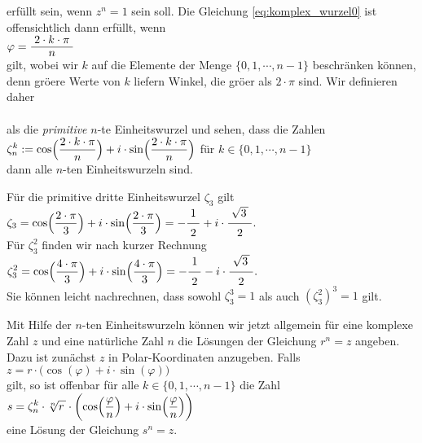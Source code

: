 erf\"{u}llt sein, wenn $z^n = 1$ sein soll.  Die Gleichung \ref{eq:komplex_wurzel0} ist offensichtlich dann
erf\"{u}llt, wenn 
\\[0.2cm]
\hspace*{1.3cm}
$\varphi = \bruch{2 \cdot k \cdot \pi}{n}$
\\[0.2cm]
gilt, wobei wir $k$ auf die Elemente der Menge $\{0,1, \cdots, n-1\}$ beschr\"{a}nken k\"{o}nnen, denn gr\"{o}\3ere
Werte von $k$ liefern Winkel, die gr\"{o}\3er als $2 \cdot \pi$ sind.  Wir definieren daher
\\[0.2cm]
\hspace*{1.3cm}
\colorbox{red}{}
\\[0.2cm]
als die \emph{\color{blue}primitive} $n$-te Einheitswurzel und sehen, dass die Zahlen
\\[0.2cm]
\hspace*{1.3cm}
$\displaystyle\zeta_n^k := \cos\Bigl(\frac{2 \cdot k \cdot \pi}{n}\Bigr) + i \cdot \sin\Bigl(\frac{2 \cdot k \cdot \pi}{n}\Bigr)$
\quad f\"{u}r $k \in \{ 0, 1, \cdots, n-1 \}$
\\[0.2cm]
dann alle $n$-ten Einheitswurzeln sind.

\example
F\"{u}r die primitive dritte Einheitswurzel $\zeta_3$ gilt
\\[0.2cm]
\hspace*{1.3cm}
$\ds\zeta_3 = \cos\Bigl(\frac{2 \cdot \pi}{3}\Bigr) + i \cdot \sin\Bigl(\frac{2 \cdot \pi}{3}\Bigr)
 = - \bruch{1}{2} + i \cdot \bruch{\sqrt{3\,}}{2}. 
$
\\[0.2cm] 
F\"{u}r $\zeta_3^2$ finden wir nach kurzer Rechnung
\\[0.2cm]
\hspace*{1.3cm}
$\ds\zeta_3^2 = \cos\Bigl(\frac{4 \cdot \pi}{3}\Bigr) + i \cdot \sin\Bigl(\frac{4 \cdot \pi}{3}\Bigr)
 = - \bruch{1}{2} - i \cdot \bruch{\sqrt{3\,}}{2}. 
$
\\[0.2cm]
Sie k\"{o}nnen leicht nachrechnen, dass sowohl $\zeta_3^3 = 1$ als auch $(\zeta_3^2)^3 = 1$ gilt.
\vspace*{0.2cm}

Mit Hilfe der $n$-ten Einheitswurzeln k\"{o}nnen wir jetzt allgemein f\"{u}r eine komplexe Zahl $z$ und eine
nat\"{u}rliche Zahl $n$ die L\"{o}sungen der Gleichung $r^n = z$ angeben.  Dazu ist zun\"{a}chst $z$ in
Polar-Koordinaten anzugeben.  Falls
\\[0.2cm]
\hspace*{1.3cm}
$z = r \cdot \bigl(\cos(\varphi) + i \cdot \sin(\varphi)\bigr)$
\\[0.2cm]
gilt, so ist offenbar f\"{u}r alle $k \in \{ 0, 1, \cdots, n - 1 \}$ die Zahl
\\[0.2cm]
\hspace*{1.3cm}
$\displaystyle s = \zeta_n^k \cdot \sqrt[n]{r\,} \cdot 
     \biggl(\cos\Bigl(\frac{\varphi}{n}\Bigr) + i \cdot \sin\Bigl(\frac{\varphi}{n}\Bigr) \biggr)
$
\\[0.2cm] 
eine L\"{o}sung der Gleichung $s^n = z$.

